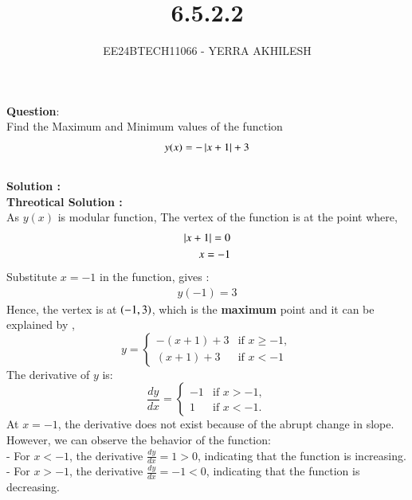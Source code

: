\documentclass[journal]{IEEEtran}
\begin{document}

\vspace{3cm}

\title{6.5.2.2}
\author{EE24BTECH11066 - YERRA AKHILESH}
{\let\newpage\relax\maketitle}

\renewcommand{\thefigure}{\theenumi}
\renewcommand{\thetable}{\theenumi}
\setlength{\intextsep}{10pt} %

\renewcommand{\thetable}{\theenumi}
\textbf{Question}:\\
Find the Maximum and Minimum values of the function \\
$$y(x) = - \left\vert x + 1\right\vert +3$$\\
\textbf{Solution : }\\
\textbf{Threotical Solution :}\\

As $y(x)$ is modular function, The vertex of the function is at the point where,
\begin{align}
    \left\vert x + 1\right\vert = 0\\
    x = -1
\end{align}
Substitute $x = -1$ in the function, gives :
\begin{align}
    y(-1) = 3
\end{align}
Hence, the vertex is at $\left(-1,3\right)$, which is the \textbf{maximum} point and it can be explained by ,
$$y =
\begin{cases} 
-(x+1) + 3 & \text{if } x \geq -1, \\ 
(x+1) + 3 & \text{if } x < -1
\end{cases}
$$
The derivative of $y$ is:
$$
\frac{dy}{dx} =
\begin{cases} 
-1 & \text{if } x > -1, \\ 
1 & \text{if } x < -1.
\end{cases}
$$
At $x = -1$, the derivative does not exist because of the abrupt change in slope. However, we can observe the behavior of the function:\\
- For  $x < -1$, the derivative $\frac{dy}{dx} = 1 > 0$, indicating that the function is increasing.\\
- For $x > -1$, the derivative $\frac{dy}{dx} = -1 < 0$, indicating that the function is decreasing.\\
\end{document}
